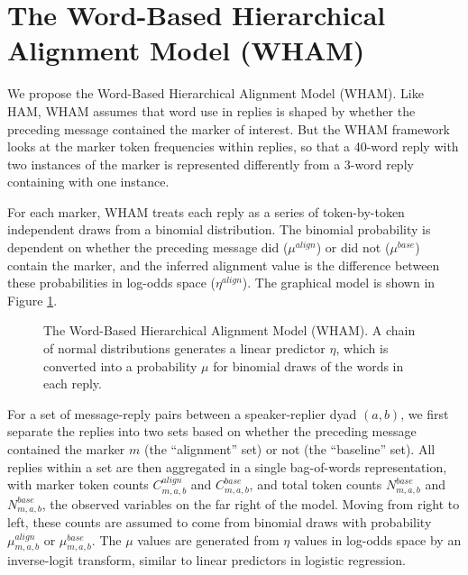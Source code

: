 \documentclass[11pt]{article}
\begin{document}
\section{The Word-Based Hierarchical Alignment Model (WHAM)}


We propose the Word-Based Hierarchical Alignment Model (WHAM). Like HAM, WHAM  assumes that word use in replies is shaped by whether the preceding message contained the marker of interest. But the WHAM framework looks at the marker token frequencies within  replies, so that a 40-word reply with two instances of the marker is represented differently from a 3-word reply containing with one instance.

For each marker, WHAM treats each reply as a series of token-by-token independent draws from a binomial distribution. The binomial probability is dependent on whether the preceding message did ($\mu^{align}$) or did not ($\mu^{base}$) contain the marker, and the inferred alignment value is the difference between these probabilities in log-odds space ($\eta^{align}$). The graphical model is shown in Figure \ref{fig:wham}.

\begin{figure}[t]
  \begin{center}
    
  \end{center}
  \caption{The Word-Based Hierarchical Alignment Model (WHAM). A chain of normal distributions generates a linear predictor $\eta$, which is converted into a probability $\mu$ for binomial draws of the words in each reply.}\label{fig:wham}
\end{figure}

For a set of message-reply pairs between a speaker-replier dyad $(a,b)$, we first separate the replies into two sets based on whether the preceding message contained the marker $m$ (the ``alignment'' set) or not (the ``baseline'' set). All replies within a set are then aggregated in a single bag-of-words representation, with marker token counts $C^{align}_{m,a,b}$ and $C^{base}_{m,a,b}$, and total token counts $N^{base}_{m,a,b}$ and $N^{base}_{m,a,b}$, the observed variables on the far right of the model.  Moving from right to left, these counts are assumed to come from binomial draws with probability $\mu^{align}_{m,a,b}$ or $\mu^{base}_{m,a,b}$.  The $\mu$ values are generated from $\eta$ values in log-odds space by an inverse-logit transform, similar to linear predictors in logistic regression.
\end{document}
